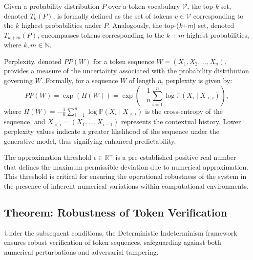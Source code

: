 \documentclass{article}
\begin{document}
Given a probability distribution \(P\) over a token vocabulary \(\mathcal{V}\), the top-\textit{k} set, denoted \(T_k(P)\), is formally defined as the set of tokens \(v \in \mathcal{V}\) corresponding to the \(k\) highest probabilities under \(P\). Analogously, the top-(\textit{k}+\textit{m}) set, denoted \(T_{k+m}(P)\), encompasses tokens corresponding to the \(k+m\) highest probabilities, where \(k, m \in \mathbb{N}\).

Perplexity, denoted \(PP(W)\) for a token sequence \(W = (X_1, X_2, \ldots, X_n)\), provides a measure of the uncertainty associated with the probability distribution governing \(W\). Formally, for a sequence \(W\) of length \(n\), perplexity is given by:
\[
PP(W) = \exp\left(H(W)\right) = \exp\left(-\frac{1}{n}\sum_{i=1}^n \log \mathbb{P}(X_i \mid X_{<i})\right),
\]
where \(H(W) = -\frac{1}{n}\sum_{i=1}^n \log \mathbb{P}(X_i \mid X_{<i})\) is the cross-entropy of the sequence, and \(X_{<i} = (X_1, \ldots, X_{i-1})\) represents the contextual history. Lower perplexity values indicate a greater likelihood of the sequence under the generative model, thus signifying enhanced predictability.

The approximation threshold \(\epsilon \in \mathbb{R}^+\) is a pre-established positive real number that defines the maximum permissible deviation due to numerical approximation. This threshold is critical for ensuring the operational robustness of the system in the presence of inherent numerical variations within computational environments.

\subsection{Theorem: Robustness of Token Verification}

Under the subsequent conditions, the Deterministic Indeterminism framework ensures robust verification of token sequences, safeguarding against both numerical perturbations and adversarial tampering.
\end{document}
